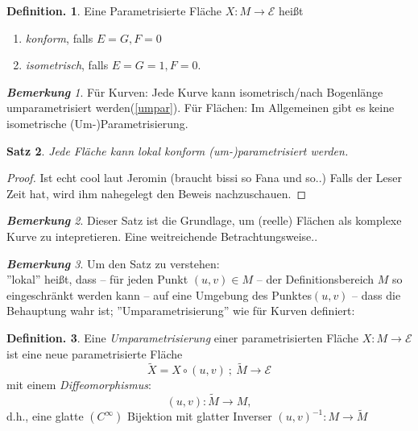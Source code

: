 \documentclass[a4paper,oneside,11pt,DIV=12,parskip=half]{scrartcl}
\newcommand{\E}{\mathcal E}
\theoremstyle{plain}
\newtheorem{theorem}{Satz}[section]
\theoremstyle{definition}
\newtheorem{definition}[theorem]{Definition.}
\newtheorem{remark, definition}[theorem]{Bemerkung und Definition.}
\newtheorem{lemma, definition}[theorem]{Lemma und Definition.}
\theoremstyle{remark}
\newtheorem*{remark}{\textbf{Bemerkung}}
\newtheorem*{remark, example}{\textbf{Bemerkung und Beispiel}}
\begin{document}
\begin{definition}
	
	Eine Parametrisierte Fläche $ X : M \rightarrow \E $ heißt 
	\begin{enumerate}
		\item \emph{konform}, falls $ E = G, F = 0 $
		\item \emph{isometrisch}, falls $ E = G = 1, F= 0 $.
	\end{enumerate}
	
\end{definition}


\begin{remark}
	
	Für Kurven: Jede Kurve kann isometrisch/nach Bogenlänge umparametrisiert werden(\ref{umpar}).  Für Flächen: Im Allgemeinen gibt es keine isometrische (Um-)Parametrisierung.
	
\end{remark}

\begin{theorem}
	
	Jede Fläche kann lokal konform (um-)parametrisiert werden. 
	
\end{theorem}

\begin{proof}
	
	Ist echt cool laut Jeromin (braucht bissi so Fana und so..)
	Falls der Leser Zeit hat, wird ihm nahegelegt den Beweis nachzuschauen.
	
\end{proof}

\begin{remark}
	
	Dieser Satz ist die Grundlage, um (reelle) Flächen als komplexe Kurve zu intepretieren. Eine weitreichende Betrachtungsweise..
\end{remark}

\begin{remark}
	
	Um den Satz zu verstehen:\\
	''lokal'' heißt, dass -- für jeden Punkt $ (u,v) \in M $ -- der Definitionsbereich $M$ so eingeschränkt werden kann -- auf eine Umgebung des Punktes$ (u,v) $ -- dass die Behauptung wahr ist;
	''Umparametrisierung'' wie für Kurven definiert:
\end{remark}

\begin{definition}
	
	Eine \emph{Umparametrisierung} einer parametrisierten Fläche $ X: M \rightarrow \E $ ist eine neue parametrisierte Fläche \[ \widetilde{X}=X\circ(u,v)~;~ \widetilde{M} \rightarrow \E \]
	mit einem \emph{Diffeomorphismus}: \[ (u,v): \widetilde{M} \rightarrow M, \] d.h., eine glatte $ (C^\infty) $ Bijektion mit glatter Inverser $ (u,v)^{-1}:M \rightarrow \widetilde{M} $
		
\end{definition}
\end{document}
